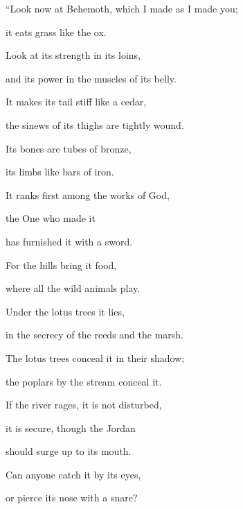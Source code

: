 {\par }{\Q {}“Look
now
at Behemoth,
which
I made
as I made you;
\par }{\Q it eats
grass
like the ox.
\par }{\Q {}Look
at its strength
in its loins,
\par }{\Q and its power
in the muscles
of its belly.
\par }{\Q {}It
makes its tail
stiff
like
a cedar,
\par }{\Q the sinews
of its thighs
are tightly wound.
\par }{\Q {}Its bones
are tubes
of bronze,
\par }{\Q its limbs
like bars of
iron.
\par }{\Q {}It ranks first
among the works
of God,
\par }{\Q the One who made
it
\par }{\Q has furnished it with a sword.
\par }{\Q {}For
the hills
bring
it food,
\par }{\Q where
all
the wild
animals
play.
\par }{\Q {}Under
the lotus trees
it lies,
\par }{\Q in the secrecy
of the reeds
and the marsh.
\par }{\Q {}The lotus trees
conceal
it in their shadow;
\par }{\Q the poplars
by the stream conceal it.
\par }{\Q {}If
the river
rages,
it is not
disturbed,
\par }{\Q it is secure,
though
the Jordan
\par }{\Q should surge
up to
its mouth.
\par }{\Q {}Can anyone catch
it by its eyes,
\par }{\Q or pierce
its nose
with a snare?

}
